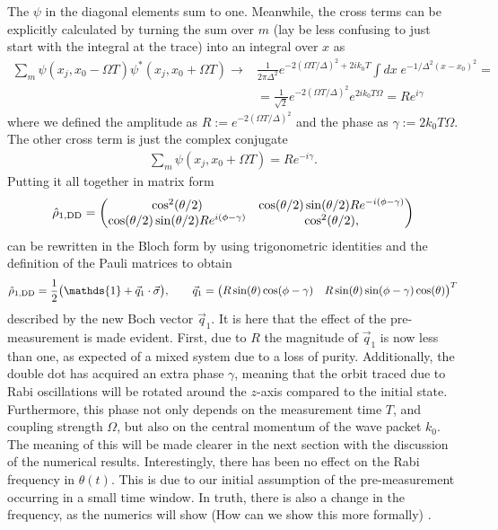 \documentclass{article}
\newcommand{\Id}{\mathds{1}}
\newcommand\sj[1]{ {\color{orange} #1} }
\begin{document}
The $\psi$ in the diagonal elements sum to one. 
Meanwhile, the cross terms can be explicitly calculated by turning the 
sum over $m$ \sj{(lay be less confusing to just start with the integral at the trace)} into an integral over $x$ as
\begin{align*}
    \sum_m \psi(x_j, x_0-\Omega T)
    \psi^*(x_j, x_0 + \Omega T) \rightarrow & \frac{1}{2\pi\Delta^2} e^{-2(\Omega T/\Delta)^2+2ik_0T} \int dx 
    \; e^{-1/\Delta^2 (x-x_0)^2} = \\
    & = \frac{1}{\sqrt{2}} e^{-2(\Omega T /\Delta)^2} e^{2ik_0T\Omega} = R e^{i\gamma} 
\end{align*}
where we defined the amplitude as $R:= e^{-2(\Omega T /\Delta)^2} $ and 
the phase as $\gamma := 2 k_0 T \Omega$. The other cross term is
just the complex conjugate
\begin{align*}
    \sum_m \psi(x_j, x_0+\Omega T) = R e^{-i\gamma}.
\end{align*}
Putting it all together in matrix form
\begin{align*}
    \hat{\rho}_{1,\rm DD} = 
    \begin{pmatrix}
        \cos^2(\theta/2)& \cos(\theta/2) \sin(\theta/2) R e^{-i(\phi-\gamma)} \\
        \cos(\theta/2) \sin(\theta/2) R e^{i(\phi-\gamma)} & \cos^2(\theta/2), 
    \end{pmatrix}
\end{align*}
can be rewritten in the Bloch form by using trigonometric identities and the definition of the Pauli
matrices to obtain
\begin{align}
    \hat{\rho}_{1,\rm DD} = \frac{1}{2} \big( \Id + \vec{q}_1 \cdot \vec{\sigma} \big), \qquad 
    \vec{q}_1 = \begin{pmatrix} R \sin(\theta)\cos(\phi -\gamma) & R \sin(\theta)\sin(\phi -\gamma)  
                            \cos(\theta) \end{pmatrix}^T 
\end{align}
described by the new Boch vector $\vec{q}_1$. It is here that the effect of the 
pre-measurement is made evident. 
First, due to $R$ the magnitude of $\vec{q}_1$ is now less than one, 
as expected of a mixed system due to a loss of purity. Additionally, the double dot has acquired an extra phase 
$\gamma$, meaning that the orbit traced due to Rabi oscillations will be rotated around the $z$-axis 
compared to the initial state. Furthermore, this phase not only depends on the 
measurement time $T$, and coupling strength $\Omega$, but also on the central momentum of the wave packet $k_0$. 
The meaning of this will be made clearer in the next section with the discussion of the numerical results.
Interestingly, there has been no effect on the
Rabi frequency in $\theta (t)$. This is due to our initial assumption of the pre-measurement occurring in a small time window. 
In truth, there is also a change in the frequency, as the numerics will show \sj{(How
can we show this more formally)}.
\end{document}
